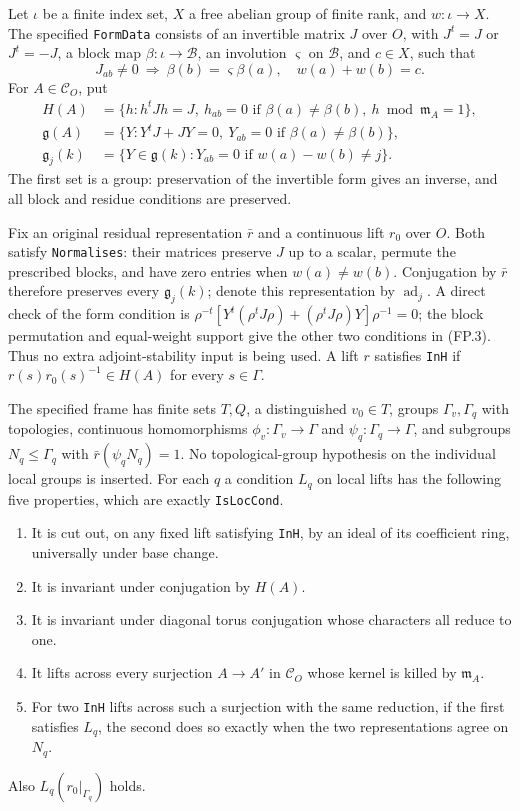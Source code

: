 Let $\iota$ be a finite index set, $X$ a free abelian group of finite
rank, and $w:\iota\to X$.  The specified \texttt{FormData} consists
of an invertible matrix $J$ over $O$, with $J^t=J$ or $J^t=-J$,
a block map $\beta:\iota\to\mathcal B$, an involution
$\varsigma$ on $\mathcal B$, and $c\in X$, such that
\[
 J_{ab}\ne0\ \Longrightarrow\
       \beta(b)=\varsigma\beta(a),\quad w(a)+w(b)=c .
 \tag{FP.2}
\]
For $A\in\mathcal C_O$, put
\[
 \begin{split}
 H(A)&=\{h:h^tJh=J,\ h_{ab}=0\text{ if }\beta(a)\ne\beta(b),
                         \ h\bmod\mathfrak m_A=1\},\\
 \mathfrak g(A)&=\{Y:Y^tJ+JY=0,\
                     Y_{ab}=0\text{ if }\beta(a)\ne\beta(b)\},\\
 \mathfrak g_j(k)&=\{Y\in\mathfrak g(k):
                       Y_{ab}=0\text{ if }w(a)-w(b)\ne j\}.
 \end{split}
 \tag{FP.3}
\]
The first set is a group: preservation of the invertible form gives
an inverse, and all block and residue conditions are preserved.

Fix an original residual representation $\bar r$ and a continuous
lift $r_0$ over $O$.  Both satisfy \texttt{Normalises}: their
matrices preserve $J$ up to a scalar, permute the prescribed blocks,
and have zero entries when $w(a)\ne w(b)$.  Conjugation by
$\bar r$ therefore preserves every $\mathfrak g_j(k)$; denote this
representation by $\operatorname{ad}_j$.
A direct check of the form condition is
$\rho^{-t}[Y^t(\rho^tJ\rho)+(\rho^tJ\rho)Y]\rho^{-1}=0$;
the block permutation and equal-weight support give the other
two conditions in (FP.3).  Thus no extra adjoint-stability input
is being used.
A lift $r$ satisfies \texttt{InH} if
$r(s)r_0(s)^{-1}\in H(A)$ for every $s\in\Gamma$.

The specified frame has finite sets $T,Q$, a distinguished $v_0\in T$,
groups $\Gamma_v,\Gamma_q$ with topologies, continuous homomorphisms
$\phi_v:\Gamma_v\to\Gamma$ and $\psi_q:\Gamma_q\to\Gamma$,
and subgroups $N_q\le\Gamma_q$ with
$\bar r(\psi_qN_q)=1$.  No topological-group hypothesis on the
individual local groups is inserted.
For each $q$ a condition $L_q$ on local lifts has the following
five properties, which are exactly \texttt{IsLocCond}.
\begin{enumerate}
\item It is cut out, on any fixed lift satisfying \texttt{InH}, by
an ideal of its coefficient ring, universally under base change.
\item It is invariant under conjugation by $H(A)$.
\item It is invariant under diagonal torus conjugation whose
characters all reduce to one.
\item It lifts across every surjection $A\to A'$ in $\mathcal C_O$
whose kernel is killed by $\mathfrak m_A$.
\item For two \texttt{InH} lifts across such a surjection with the
same reduction, if the first satisfies $L_q$, the second does so
exactly when the two representations agree on $N_q$.
\end{enumerate}
Also $L_q(r_0|_{\Gamma_q})$ holds.


